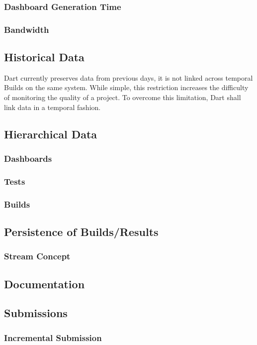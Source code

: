 \documentclass{InsightBook}
\begin{document}
\subsubsection{Dashboard Generation Time}

\subsubsection{Bandwidth}

\subsection{Historical Data}
Dart currently preserves data from previous days, it is not
linked across temporal Builds on the same system.  While simple, this
 restriction increases the difficulty of monitoring the quality of a
project.  To overcome this limitation, Dart shall link data in a
temporal fashion.
\subsection{Hierarchical Data}
  \subsubsection{Dashboards}
  \subsubsection{Tests}
  \subsubsection{Builds}

\subsection{Persistence of Builds/Results}
\subsubsection{Stream Concept}

\subsection{Documentation}

\subsection{Submissions}
\subsubsection{Incremental Submission}
\end{document}
